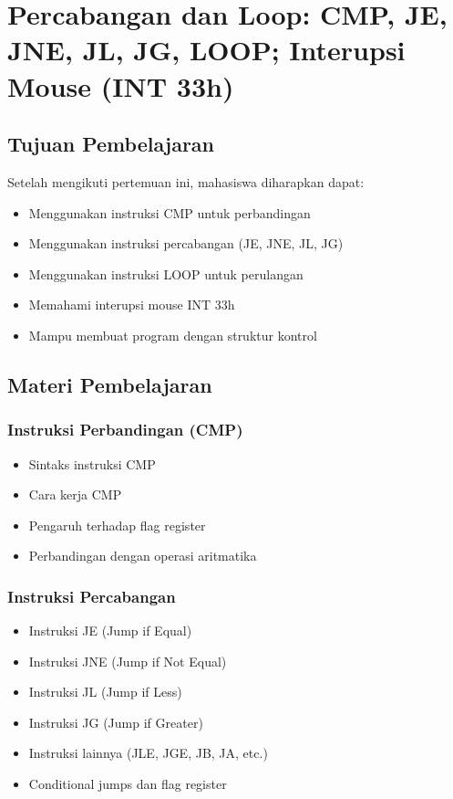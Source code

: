 \chapter{Percabangan dan Loop: CMP, JE, JNE, JL, JG, LOOP; Interupsi Mouse (INT 33h)}

\section{Tujuan Pembelajaran}
Setelah mengikuti pertemuan ini, mahasiswa diharapkan dapat:
\begin{itemize}
\item Menggunakan instruksi CMP untuk perbandingan
\item Menggunakan instruksi percabangan (JE, JNE, JL, JG)
\item Menggunakan instruksi LOOP untuk perulangan
\item Memahami interupsi mouse INT 33h
\item Mampu membuat program dengan struktur kontrol
\end{itemize}

\section{Materi Pembelajaran}

\subsection{Instruksi Perbandingan (CMP)}
\begin{itemize}
\item Sintaks instruksi CMP
\item Cara kerja CMP
\item Pengaruh terhadap flag register
\item Perbandingan dengan operasi aritmatika
\end{itemize}

\subsection{Instruksi Percabangan}
\begin{itemize}
\item Instruksi JE (Jump if Equal)
\item Instruksi JNE (Jump if Not Equal)
\item Instruksi JL (Jump if Less)
\item Instruksi JG (Jump if Greater)
\item Instruksi lainnya (JLE, JGE, JB, JA, etc.)
\item Conditional jumps dan flag register
\end{itemize}

